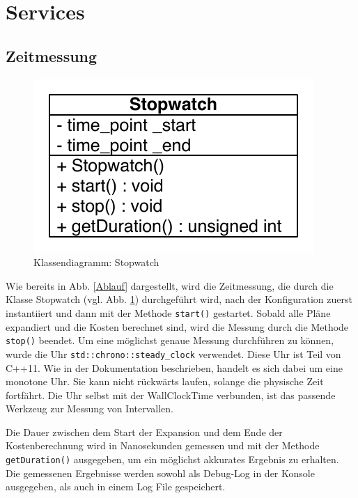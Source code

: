 \section{Services}
\subsection{Zeitmessung}

\begin{figure}[ht]
  \centering
  \includegraphics[scale=0.75]{04_Implementierung/00_media/Stopwatch.pdf}
  \caption{Klassendiagramm: Stopwatch}
  \label{ClassStopwatch}
\end{figure}

Wie bereits in Abb. \ref{Ablauf} dargestellt, wird die Zeitmessung, die durch die Klasse Stopwatch (vgl. Abb. \ref{ClassStopwatch}) durchgeführt wird, nach der Konfiguration zuerst instantiiert und dann mit der Methode \texttt{start()} gestartet. Sobald alle Pläne expandiert und die Kosten berechnet sind, wird die Messung durch die Methode \texttt{stop()} beendet. Um eine möglichst genaue Messung durchführen zu können, wurde die Uhr \texttt{std::chrono::steady\_clock} verwendet. Diese Uhr ist Teil von C++11. Wie in der Dokumentation \cite{cppreference_2015_clock} beschrieben, handelt es sich dabei um eine monotone Uhr. Sie kann nicht rückwärts laufen, solange die physische Zeit fortfährt. Die Uhr selbst mit der Wall\-Clock\-Time verbunden, ist das passende Werkzeug zur Messung von Intervallen. 

Die Dauer zwischen dem Start der Expansion und dem Ende der Kostenberechnung wird in Nanosekunden gemessen und mit der Methode \texttt{getDuration()} ausgegeben, um ein möglichst akkurates Ergebnis zu erhalten. Die gemessenen Ergebnisse werden sowohl als Debug-Log in der Konsole ausgegeben, als auch  in einem Log File gespeichert.




